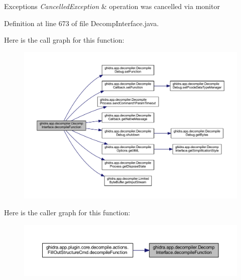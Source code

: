 \begin{DoxyExceptions}{Exceptions}
{\em Cancelled\+Exception} & operation was cancelled via monitor \\
\hline
\end{DoxyExceptions}


Definition at line 673 of file Decomp\+Interface.\+java.

Here is the call graph for this function\+:
\nopagebreak
\begin{figure}[H]
\begin{center}
\leavevmode
\includegraphics[width=350pt]{classghidra_1_1app_1_1decompiler_1_1_decomp_interface_afcd859e79e0529d90edaf9ec0731adb6_cgraph}
\end{center}
\end{figure}
Here is the caller graph for this function\+:
\nopagebreak
\begin{figure}[H]
\begin{center}
\leavevmode
\includegraphics[width=350pt]{classghidra_1_1app_1_1decompiler_1_1_decomp_interface_afcd859e79e0529d90edaf9ec0731adb6_icgraph}
\end{center}
\end{figure}
\mbox{\label{classghidra_1_1app_1_1decompiler_1_1_decomp_interface_a627a3e6485e083dfbb41ffa25b131ad4}} 
